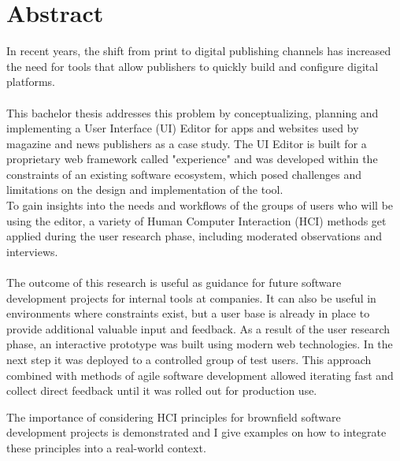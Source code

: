 %

\chapter*{Abstract}
In recent years, the shift from print to digital publishing channels has increased the need for tools that allow publishers to quickly build and configure digital platforms.
\\\\
This bachelor thesis addresses this problem by conceptualizing, planning and implementing a User Interface (UI) Editor for apps and websites used by magazine and news publishers as a case study.
The UI Editor is built for a proprietary web framework called "\Gls{experience}" and was developed within the constraints of an existing software ecosystem, which posed challenges and limitations on the design and implementation of the tool.
\\
To gain insights into the needs and workflows of the groups of users who will be using the editor, a variety of Human Computer Interaction (HCI) methods get applied during the user research phase, including moderated observations and interviews. 
\\\\
The outcome of this research is useful as guidance for future software development projects for internal tools at companies. It can also be useful in environments where constraints exist, but a user base is already in place to provide additional valuable input and feedback.
As a result of the user research phase, an interactive prototype was built using modern web technologies.
In the next step it was deployed to a controlled group of test users.
This approach combined with methods of agile software development allowed iterating fast and collect direct feedback until it was rolled out for production use.

The importance of considering HCI principles for brownfield software development projects is demonstrated and I give examples on how to integrate these principles into a real-world context.